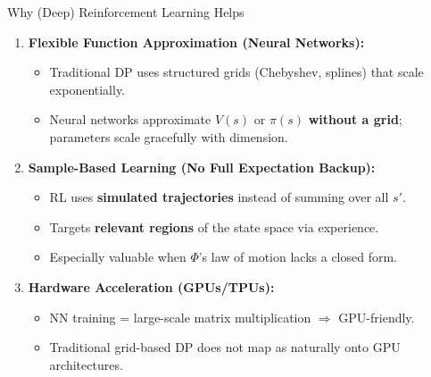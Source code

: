 \documentclass[10pt,english,aspectratio=169]{beamer}
\begin{document}
\begin{frame}{Why (Deep) Reinforcement Learning Helps}
\begin{enumerate}
    \item \textbf{Flexible Function Approximation (Neural Networks):}
    \begin{itemize}
        \item Traditional DP uses structured grids (Chebyshev, splines) that scale exponentially.
        \item Neural networks approximate $V(s)$ or $\pi(s)$ \textbf{without a grid}; parameters scale gracefully with dimension.
    \end{itemize}

    \vspace{0.2cm}
    \item \textbf{Sample-Based Learning (No Full Expectation Backup):}
    \begin{itemize}
        \item RL uses \textbf{simulated trajectories} instead of summing over all $s'$.
        \item Targets \textbf{relevant regions} of the state space via experience.
        \item Especially valuable when $\Phi$'s law of motion lacks a closed form.
    \end{itemize}

    \vspace{0.2cm}
    \item \textbf{Hardware Acceleration (GPUs/TPUs):}
    \begin{itemize}
        \item NN training = large-scale matrix multiplication $\Rightarrow$ GPU-friendly.
        \item Traditional grid-based DP does not map as naturally onto GPU architectures.
    \end{itemize}
\end{enumerate}
\end{frame}
\end{document}
